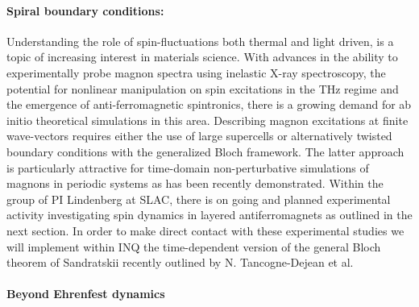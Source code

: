 
\paragraph{Spiral boundary conditions:}
Understanding the role of spin-fluctuations both thermal and light driven, is a topic of increasing interest in materials science. With advances in the ability to experimentally probe magnon spectra using inelastic X-ray spectroscopy, the potential for nonlinear manipulation on spin excitations in the THz regime and the emergence of anti-ferromagnetic spintronics, there is a growing demand for ab initio theoretical simulations in this area. Describing magnon excitations at finite wave-vectors requires either the use of large supercells or alternatively twisted boundary conditions with the generalized Bloch framework. The latter approach is particularly attractive for time-domain non-perturbative simulations of magnons in periodic systems as has been recently demonstrated. Within the group of PI Lindenberg at SLAC, there is on going and planned experimental activity investigating spin dynamics in layered antiferromagnets as outlined in the next section. In order to make direct contact with these experimental studies we will implement within \textsc{INQ} the time-dependent version of the general Bloch theorem of Sandratskii recently outlined by N. Tancogne-Dejean et al. 

\paragraph{Beyond Ehrenfest dynamics}

